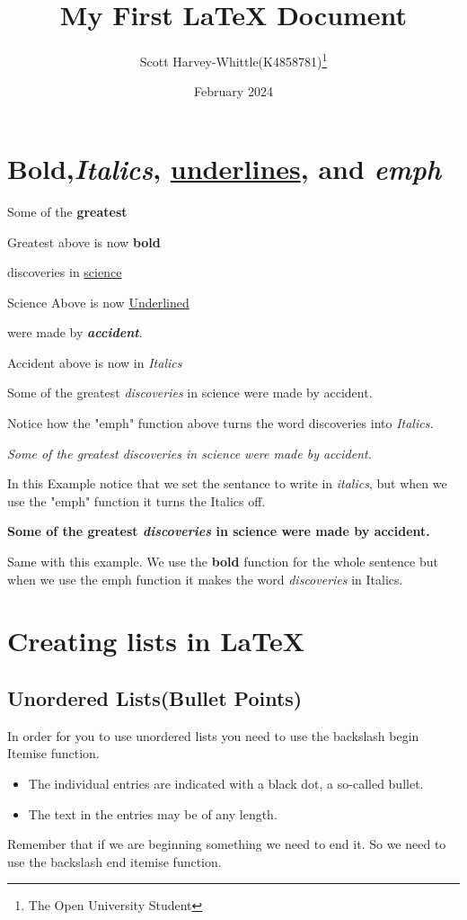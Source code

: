 \documentclass[12pt,a4paper,landscape]{article}
\title{My First \LaTeX{} Document}
\author{Scott Harvey-Whittle(K4858781)\thanks {The Open University Student}}
\date{February 2024}
\begin{document}
\maketitle
\begin{flushleft}
    

\section{\textbf{Bold},\textit{Italics}, \underline{underlines}, and \emph{emph}}
Some of the \textbf{greatest}

Greatest above is now \textbf{bold} 

discoveries in \underline{science} 

Science Above is now \underline{Underlined}

were made by \textbf{\textit{accident}}.

Accident above is now in \textit{Italics}


Some of the greatest \emph{discoveries} in science 
were made by accident.

Notice how the "emph" function above turns the word discoveries into  \emph{Italics.}

\textit{Some of the greatest \emph{discoveries} 
in science were made by accident.}

In this Example notice that we set the sentance to write in \textit{italics}, but when we use the "emph" function it turns the Italics off. 

\textbf{Some of the greatest \emph{discoveries} 
in science were made by accident.}

Same with this example. We use the \textbf{bold} function for the whole sentence but when we use the emph function it makes the word \textit{discoveries} in Italics.

\section{Creating lists in \LaTeX{}}

\subsection{Unordered Lists(Bullet Points)}

In order for you to use unordered lists you need to use the backslash begin Itemise function.

\begin{itemize}
  \item The individual entries are indicated with a black dot, a so-called bullet.
  \item The text in the entries may be of any length.
\end{itemize}
Remember that if we are beginning something we need to end it. So we need to use the backslash end itemise function. 


\end{flushleft}
\end{document}
